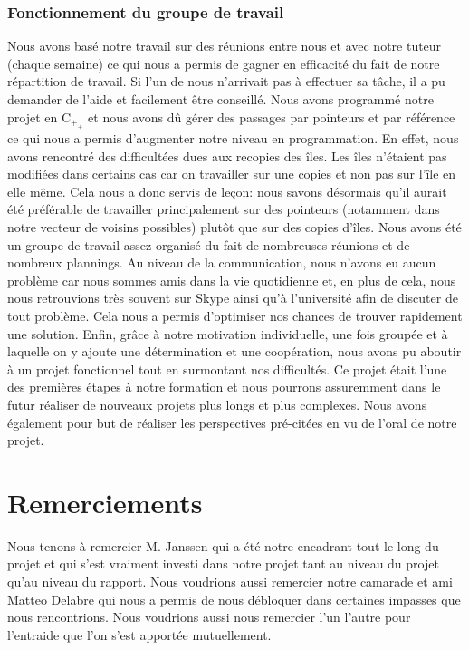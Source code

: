 \documentclass[french]{article}
\begin{document}
        \subsubsection{\large Fonctionnement du groupe de travail} 
        \hspace{0.5cm}Nous avons basé notre travail sur des réunions entre nous et avec notre tuteur (chaque semaine) ce qui nous a permis de gagner en efficacité du fait de notre répartition de travail. Si l’un de nous n’arrivait pas à effectuer sa tâche, il a pu demander de l’aide et facilement être conseillé. Nous avons programmé notre projet en C$_+_+$ et nous avons dû gérer des passages par pointeurs et par référence ce qui nous a permis d'augmenter notre niveau en programmation. En effet, nous avons rencontré des difficultées dues aux recopies des îles. Les îles n'étaient pas modifiées dans certains cas car on travailler sur une copies et non pas sur l'île en elle même. Cela nous a donc servis de leçon: nous savons désormais qu'il aurait été préférable de travailler principalement sur des pointeurs (notamment dans notre vecteur de voisins possibles) plutôt que sur des copies d'îles.
        Nous avons été un groupe de travail assez organisé du fait de nombreuses réunions et de nombreux plannings.
        Au niveau de la communication, nous n’avons eu aucun problème car nous sommes amis dans la vie quotidienne et, en plus de cela, nous nous retrouvions très souvent sur Skype ainsi qu’à l’université afin de discuter de tout problème. Cela nous a permis d'optimiser nos chances de trouver rapidement une solution.
        Enfin, grâce à notre motivation individuelle, une fois groupée et à laquelle on y ajoute une détermination et une coopération, nous avons pu aboutir à un projet fonctionnel tout en surmontant nos difficultés. Ce projet était l'une des premières étapes à notre formation et nous pourrons assuremment dans le futur réaliser de nouveaux projets plus longs et plus complexes. Nous avons également pour but de réaliser les perspectives pré-citées en vu de l'oral de notre projet.
        
\section{\LARGE Remerciements}
Nous tenons à remercier M. Janssen qui a été notre encadrant tout le long du projet et qui s'est vraiment investi dans notre projet tant au niveau du projet qu'au niveau du rapport.
Nous voudrions aussi remercier notre camarade et ami Matteo Delabre qui nous a permis de nous débloquer dans certaines impasses que nous rencontrions.
Nous voudrions aussi nous remercier l'un l'autre pour l'entraide que l'on s'est apportée mutuellement.
\end{document}
